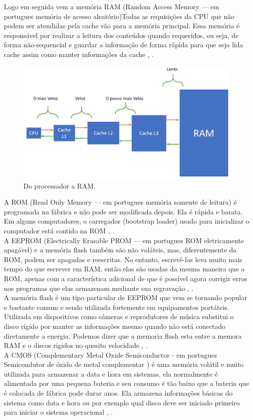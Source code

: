 Logo em seguida vem a memória RAM (Random Access Memory — em portugues memória de acesso aleatório)Todas as requisições da CPU que não podem ser atendidas pela cache vão para a memória principal. Essa memória é responsável por realizar a leitura dos conteúdos quando requeridos, ou seja, de forma não-sequencial e guardar a informação de forma rápida para que seja lida cache assim como manter informações da cache \cite{Tanenbaum2016}, \cite{Comer2012}.\\
\begin{figure}[htpb]
    \centering
   \includegraphics[scale=0.5]{imagens/velocidaderam.png}
   \caption{Do processador a RAM.}
   \label{fig:velocidade}
\end{figure}

A ROM (Read Only Memory — em portugues memória somente de leitura) é programada na fábrica e não pode ser modificada depois. Ela é rápida e barata. Em alguns computadores, o carregador (bootstrap loader) usado para inicializar o computador está contido na ROM \cite{Tanenbaum2016}, \cite{Comer2012}.\\
A EEPROM (Electrically Erasable PROM — em portugues ROM eletricamente apagável) e a memória flash também são não voláteis, mas, diferentemente da ROM, podem ser apagadas e reescritas. No entanto, escrevê-las leva muito mais tempo do que escrever em RAM, então elas são usadas da mesma maneira que a ROM, apenas com a característica adicional de que é possível agora corrigir erros nos programas que elas armazenam mediante sua regravação \cite{Tanenbaum2016}, \cite{Comer2012}.\\
A memória flash é um tipo particular de EEPROM que vem se tornando popular e  bastante comum e sendo utilizada fortemente em equipamentos portáteis. Utilizada em dispositivos como câmeras  e reprodutores de música substitui o disco rígido por manter as informações mesmo quando não está conectado diretamente a energia. Podemos dizer que a memoria flash esta entre a memora RAM e o discos rigidos no quesito velocidade \cite{Tanenbaum2016}, \cite{Comer2012}.\\
A CMOS (Complementary Metal Oxide Semiconductor - em portugues 
Semicondutor de óxido de metal complementar
) é uma memória volátil e muito utilizada para armazenar a data e hora em sistemas, ela normalmente é alimentada por uma pequena bateria e seu consumo é tão baixo que a bateria que  é colocada de fábrica pode durar anos. Ela armazena informações básicas do sistema como data e hora ou por exemplo qual disco deve ser iniciado primeiro para iniciar o sistema operacional \cite{Tanenbaum2016}, \cite{Comer2012}.
